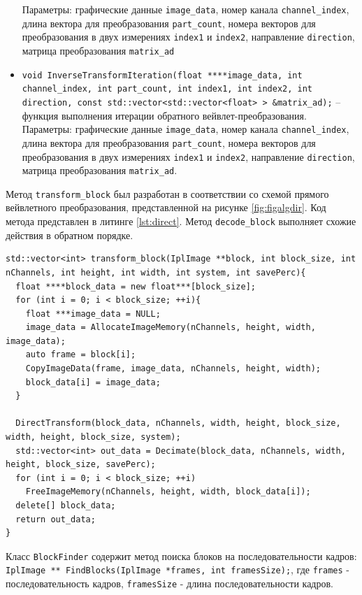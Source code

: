 \begin{itemize}
 Параметры: графические данные \texttt{image\_data}, номер канала \texttt{channel\_index}, 
 длина вектора для преобразования \texttt{part\_count}, номера векторов для преобразования в двух измерениях \texttt{index1} и \texttt{index2}, 
 направление \texttt{direction}, матрица преобразования \texttt{matrix\_ad}  
 \item \texttt{void InverseTransformIteration(float ****image\_data, 
 int channel\_index, int part\_count, int index1, int index2, int direction, 
 const std::vector<std::vector<float> > \&matrix\_ad);} – функция выполнения итерации обратного вейвлет-преобразования.
 Параметры: графические данные \texttt{image\_data}, номер канала \texttt{channel\_index}, 
 длина вектора для преобразования \texttt{part\_count}, номера векторов для преобразования в двух измерениях \texttt{index1} и \texttt{index2}, 
 направление \texttt{direction}, матрица преобразования \texttt{matrix\_ad}.
\end{itemize}

Метод \texttt{transform\_block} был разработан в соответствии со схемой прямого вейвлетного преобразования, представленной на рисунке \ref{fig:figalgdir}.
Код метода представлен в литинге \ref{lst:direct}. Метод \texttt{decode\_block} выполняет схожие действия в обратном порядке.

\begin{lstlisting}[style=realcode,caption={Код метода transform\_block},label=lst:direct]
std::vector<int> transform_block(IplImage **block, int block_size, int nChannels, int height, int width, int system, int savePerc){
  float ****block_data = new float***[block_size];
  for (int i = 0; i < block_size; ++i){
    float ***image_data = NULL;
    image_data = AllocateImageMemory(nChannels, height, width, image_data);
    auto frame = block[i];
    CopyImageData(frame, image_data, nChannels, height, width);
    block_data[i] = image_data;
  }

  DirectTransform(block_data, nChannels, width, height, block_size, width, height, block_size, system);
  std::vector<int> out_data = Decimate(block_data, nChannels, width, height, block_size, savePerc);
  for (int i = 0; i < block_size; ++i)
    FreeImageMemory(nChannels, height, width, block_data[i]);
  delete[] block_data;
  return out_data;
}
\end{lstlisting}

Класс \texttt{BlockFinder} содержит метод поиска блоков на последовательности кадров:
\texttt{IplImage ** FindBlocks(IplImage *frames, int framesSize);}, где \texttt{frames} - последовательность кадров, \texttt{framesSize} - длина последовательности кадров.

